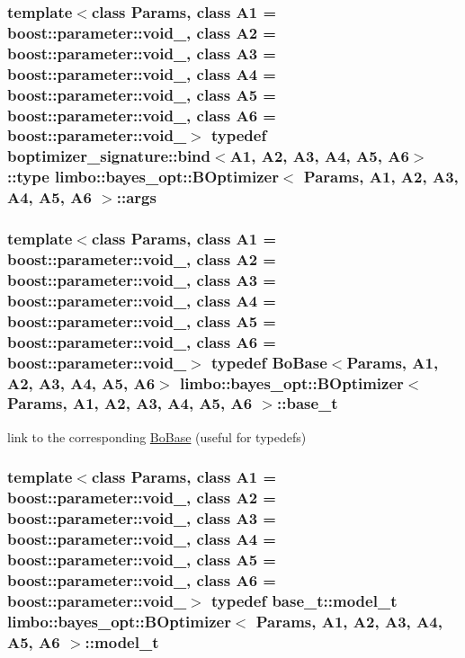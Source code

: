 \subsubsection[{args}]{\setlength{\rightskip}{0pt plus 5cm}template$<$class Params, class A1 = boost\+::parameter\+::void\+\_\+, class A2 = boost\+::parameter\+::void\+\_\+, class A3 = boost\+::parameter\+::void\+\_\+, class A4 = boost\+::parameter\+::void\+\_\+, class A5 = boost\+::parameter\+::void\+\_\+, class A6 = boost\+::parameter\+::void\+\_\+$>$ typedef boptimizer\+\_\+signature\+::bind$<$A1, A2, A3, A4, A5, A6$>$\+::type {\bf limbo\+::bayes\+\_\+opt\+::\+B\+Optimizer}$<$ Params, A1, A2, A3, A4, A5, A6 $>$\+::{\bf args}}\label{classlimbo_1_1bayes__opt_1_1_b_optimizer_afd4c6a7d361de59fac5aa3a332ea0149}
\hypertarget{classlimbo_1_1bayes__opt_1_1_b_optimizer_acfc58fcdd57f2f5520e6ba175677c319}{}
\subsubsection[{base\+\_\+t}]{\setlength{\rightskip}{0pt plus 5cm}template$<$class Params, class A1 = boost\+::parameter\+::void\+\_\+, class A2 = boost\+::parameter\+::void\+\_\+, class A3 = boost\+::parameter\+::void\+\_\+, class A4 = boost\+::parameter\+::void\+\_\+, class A5 = boost\+::parameter\+::void\+\_\+, class A6 = boost\+::parameter\+::void\+\_\+$>$ typedef {\bf Bo\+Base}$<$Params, A1, A2, A3, A4, A5, A6$>$ {\bf limbo\+::bayes\+\_\+opt\+::\+B\+Optimizer}$<$ Params, A1, A2, A3, A4, A5, A6 $>$\+::{\bf base\+\_\+t}}\label{classlimbo_1_1bayes__opt_1_1_b_optimizer_acfc58fcdd57f2f5520e6ba175677c319}


link to the corresponding \hyperlink{classlimbo_1_1bayes__opt_1_1_bo_base}{Bo\+Base} (useful for typedefs) 

\hypertarget{classlimbo_1_1bayes__opt_1_1_b_optimizer_aaddb85f5014ba377c9e2e3a64db87678}{}
\subsubsection[{model\+\_\+t}]{\setlength{\rightskip}{0pt plus 5cm}template$<$class Params, class A1 = boost\+::parameter\+::void\+\_\+, class A2 = boost\+::parameter\+::void\+\_\+, class A3 = boost\+::parameter\+::void\+\_\+, class A4 = boost\+::parameter\+::void\+\_\+, class A5 = boost\+::parameter\+::void\+\_\+, class A6 = boost\+::parameter\+::void\+\_\+$>$ typedef {\bf base\+\_\+t\+::model\+\_\+t} {\bf limbo\+::bayes\+\_\+opt\+::\+B\+Optimizer}$<$ Params, A1, A2, A3, A4, A5, A6 $>$\+::{\bf model\+\_\+t}}\label{classlimbo_1_1bayes__opt_1_1_b_optimizer_aaddb85f5014ba377c9e2e3a64db87678}


